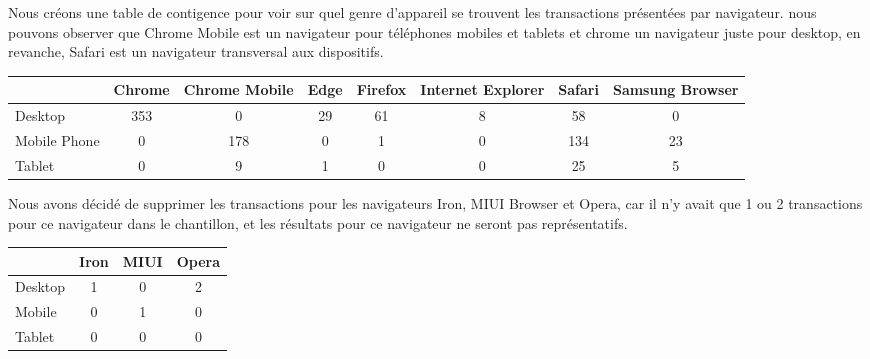 Nous créons une table de contigence pour voir sur quel genre d'appareil se trouvent les transactions présentées par navigateur. nous pouvons observer que Chrome Mobile est un navigateur pour téléphones mobiles et tablets et chrome un navigateur juste pour desktop, en revanche,  Safari est un navigateur transversal aux dispositifs.
\begin{table}[ht]
\begin{adjustbox}{width=1\textwidth}
\small
\begin{tabular}{|l|c|c|c|c|c|c|c|}
\hline
             & \multicolumn{1}{l|}{Chrome} & \multicolumn{1}{l|}{Chrome Mobile} & \multicolumn{1}{l|}{Edge} & \multicolumn{1}{l|}{Firefox} & \multicolumn{1}{l|}{Internet Explorer} & \multicolumn{1}{l|}{Safari} & \multicolumn{1}{l|}{Samsung Browser} \\ \hline
Desktop      & 353                         & 0                                  & 29                        & 61                           & 8                                      & 58                          & 0                                    \\ \hline
Mobile Phone & 0                           & 178                                & 0                         & 1                            & 0                                      & 134                         & 23                                   \\ \hline
Tablet       & 0                           & 9                                  & 1                         & 0                            & 0                                      & 25                          & 5                                    \\ \hline
\end{tabular}
\end{adjustbox}
\end{table}


Nous avons décidé de supprimer les transactions pour les navigateurs Iron, MIUI Browser et Opera, car il n'y avait que 1 ou 2 transactions pour ce navigateur dans le chantillon, et les résultats pour ce navigateur ne seront pas représentatifs.



\begin{table}[]
\begin{tabular}{|l|c|c|c|}
\hline
        & \multicolumn{1}{l|}{Iron} & \multicolumn{1}{l|}{MIUI} & \multicolumn{1}{l|}{Opera} \\ \hline
Desktop & 1                         & 0                         & 2                          \\ \hline
Mobile  & 0                         & 1                         & 0                          \\ \hline
Tablet  & 0                         & 0                         & 0                          \\ \hline
\end{tabular}
\end{table}

